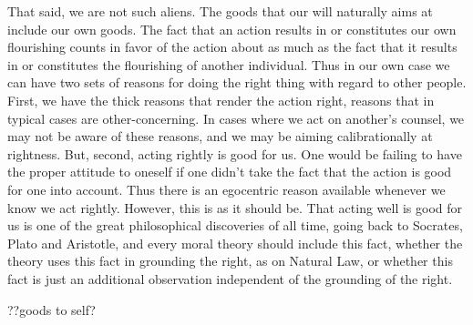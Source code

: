 That said, we are not such aliens. The goods that our will naturally aims at include our own goods. The fact that an action 
results in or constitutes our own flourishing counts in favor of the action about as much as the fact that it results in or constitutes the
flourishing of another individual. Thus in our own case we can have two sets of reasons for doing the right thing with regard to other
people. First, we have the thick reasons that render the action right, reasons that in typical cases are other-concerning. In cases where
we act on another's counsel, we may not be aware of these reasons, and we may be aiming calibrationally at rightness. But, second, acting
rightly is good for us. One would be failing to have the proper attitude to oneself if one didn't take the fact that the action is good
for one into account. Thus there is an egocentric reason available whenever we know we act rightly. However, this is as it should be.
That acting well is good for us is one of the great philosophical discoveries of all time, going back to Socrates, Plato and Aristotle,
and every moral theory should include this fact, whether the theory uses this fact in grounding the right, as on Natural Law, or whether
this fact is just an additional observation independent of the grounding of the right. 

??goods to self?


\chaptertail 